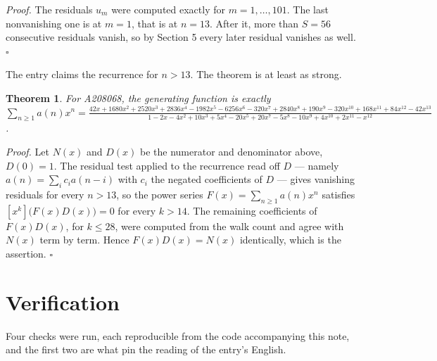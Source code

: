 \documentclass[11pt]{article}
\newtheorem{theorem}{Theorem}
\theoremstyle{definition}
\begin{document}
{\itshape Proof.} The residuals $u_m$ were computed exactly for $m = 1,\dots,101$. The last nonvanishing one is at $m = 1$, that is at $n = 13$. After it, more than $S = 56$ consecutive residuals vanish, so by Section 5 every later residual vanishes as well. $\square$

The entry claims the recurrence for $n > 13$. The theorem is at least as strong.

\begin{theorem} For A208068, the generating function is exactly $\sum_{n\ge 1} a(n)x^n = \frac{42x + 1680x^{2} + 2520x^{3} + 2836x^{4} - 1982x^{5} - 6256x^{6} - 320x^{7} + 2840x^{8} + 190x^{9} - 320x^{10} + 168x^{11} + 84x^{12} - 42x^{13}}{1 - 2x - 4x^{2} + 10x^{3} + 5x^{4} - 20x^{5} + 20x^{7} - 5x^{8} - 10x^{9} + 4x^{10} + 2x^{11} - x^{12}}$.\end{theorem}

{\itshape Proof.} Let $N(x)$ and $D(x)$ be the numerator and denominator above, $D(0)=1$. The residual test applied to the recurrence read off $D$ --- namely $a(n) = \sum_i c_i a(n-i)$ with $c_i$ the negated coefficients of $D$ --- gives vanishing residuals for every $n > 13$, so the power series $F(x)=\sum_{n\ge 1}a(n)x^n$ satisfies $[x^k]\bigl(F(x)D(x)\bigr) = 0$ for every $k > 14$. The remaining coefficients of $F(x)D(x)$, for $k \le 28$, were computed from the walk count and agree with $N(x)$ term by term. Hence $F(x)D(x) = N(x)$ identically, which is the assertion. $\square$

\section{Verification}

Four checks were run, each reproducible from the code accompanying this note, and the first two are what pin the reading of the entry's English.
\end{document}

